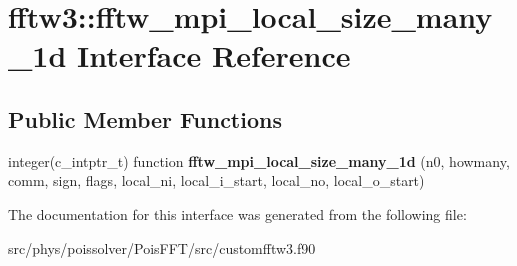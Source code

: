 \hypertarget{interfacefftw3_1_1fftw__mpi__local__size__many__1d}{}\section{fftw3\+:\+:fftw\+\_\+mpi\+\_\+local\+\_\+size\+\_\+many\+\_\+1d Interface Reference}
\label{interfacefftw3_1_1fftw__mpi__local__size__many__1d}
\subsection*{Public Member Functions}
\begin{DoxyCompactItemize}
\item 
integer(c\+\_\+intptr\+\_\+t) function {\bfseries fftw\+\_\+mpi\+\_\+local\+\_\+size\+\_\+many\+\_\+1d} (n0, howmany, comm, sign, flags, local\+\_\+ni, local\+\_\+i\+\_\+start, local\+\_\+no, local\+\_\+o\+\_\+start)\hypertarget{interfacefftw3_1_1fftw__mpi__local__size__many__1d_a79fca9cc934cd932e5d0fd53d8ae7f2c}{}\label{interfacefftw3_1_1fftw__mpi__local__size__many__1d_a79fca9cc934cd932e5d0fd53d8ae7f2c}

\end{DoxyCompactItemize}


The documentation for this interface was generated from the following file\+:\begin{DoxyCompactItemize}
\item 
src/phys/poissolver/\+Pois\+F\+F\+T/src/customfftw3.\+f90\end{DoxyCompactItemize}
